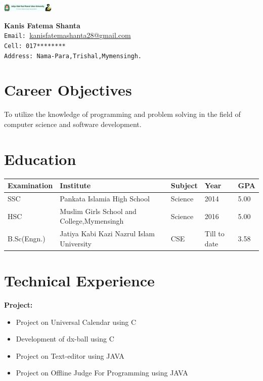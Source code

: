 \documentclass[a4paper,10pt]{article}
\begin{document}
	
	\begin{flushright}
			\includegraphics[width=2.5cm]{JKKNIU}
			\vspace{-30mm}
	\end{flushright}
	
	\begin{flushleft}
		\textbf{Kanis Fatema Shanta}\\
		\texttt{Email: }\href{https://www.facebook.com/people/Kanis-Fatema-Shanta/100007608975789}{kanisfatemashanta28@gmail.com}\\
		\texttt{Cell: 017********}\\
		\texttt{Address: Nama-Para,Trishal,Mymensingh.}
	\end{flushleft}
	
	\vspace{5mm}
	
	\section{Career Objectives}
	\hspace{12mm}To utilize the knowledge of programming and problem solving in the field of computer science and software development.
	
	\section{Education}
	\begin{tabular}{|p{3cm}||p{7cm}|p{2cm}|p{2cm}|p{1.5cm}|}
		\hline
		\bf{Examination}& \bf{Institute} & \bf{Subject} & \bf{Year} & \bf{GPA} \\
		\hline
		SSC & Pankata Islamia High School & Science & 2014 & 5.00\\
		\hline
		HSC & Muslim Girls School and College,Mymensingh & Science & 2016 & 5.00\\
		\hline
		B.Sc(Engn.) & Jatiya Kabi Kazi Nazrul Islam University & CSE & Till to date & 3.58\\
		\hline
	\end{tabular}
	
	\section{Technical Experience}


	\hspace{1mm}\bf{Project:}
	\begin{itemize}
		\item {Project on Universal Calendar using C}
		\item{Development of dx-ball using C}
	   \item{ Project on Text-editor using JAVA}
	   \item{ Project on Offline Judge For Programming using JAVA}
\end{itemize}
	
\end{document}
